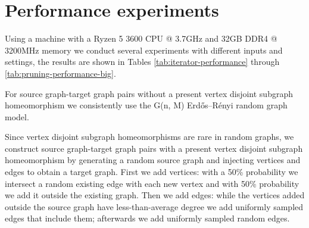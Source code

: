 \chapter{Performance experiments}
Using a machine with a Ryzen 5 3600 CPU @ 3.7GHz and 32GB DDR4 @ 3200MHz memory we conduct several experiments with different inputs and settings, the results are shown in Tables \ref{tab:iterator-performance} through \ref{tab:pruning-performance-big}. 

For source graph-target graph pairs without a present vertex disjoint subgraph homeomorphism we consistently use the G(n, M) Erdős–Rényi random graph model.

Since vertex disjoint subgraph homeomorphisms are rare in random graphs, we construct source graph-target graph pairs with a present vertex disjoint subgraph homeomorphism by generating a random source graph and injecting vertices and edges to obtain a target graph. First we add vertices: with a 50\% probability we intersect a random existing edge with each new vertex and with 50\% probability we add it outside the existing graph. Then we add edges: while the vertices added outside the source graph have less-than-average degree we add uniformly sampled edges that include them; afterwards we add uniformly sampled random edges.


